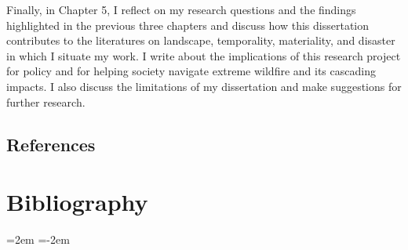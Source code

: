 \documentclass[
]{article}
\begin{document}
Finally, in Chapter 5, I reflect on my research questions and the findings highlighted in the previous three chapters and discuss how this dissertation contributes to the literatures on landscape, temporality, materiality, and disaster in which I situate my work. I write about the implications of this research project for policy and for helping society navigate extreme wildfire and its cascading impacts. I also discuss the limitations of my dissertation and make suggestions for further research.

\subsection{References}\label{references}

\section*{Bibliography}

\noindent
\leftskip=2em
\parindent=-2em
\end{document}
